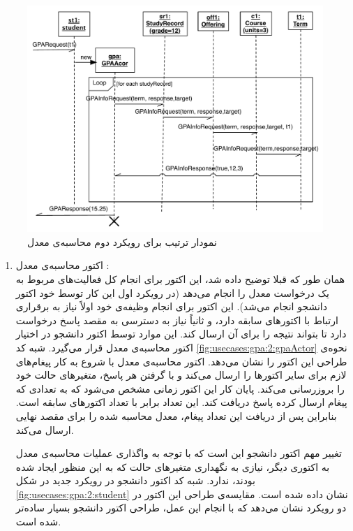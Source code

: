 \begin{figure}
    \begin{center}
	\includegraphics[width=16cm]{4-ProposedFramework/Figures/gpa_2_sequence.pdf}
    \end{center}
    \caption{\label{fig:gpa2_sequence} نمودار ترتیب برای رویکرد دوم محاسبه‌ی معدل }
\end{figure}
\FloatBarrier
\begin{enumerate}
\item اکتور محاسبه‌ی معدل :\\
همان طور که قبلا توضیح داده شد، این اکتور برای انجام کل فعالیت‌های مربوط به یک درخواست معدل را انجام می‌دهد (در رویکرد اول این‌ کار توسط خود اکتور دانشجو انجام می‌شد).  این اکتور برای انجام وظیفه‌ی خود اولاً نیاز به برقراری ارتباط با اکتورهای سابقه دارد، و ثانیاً نیاز به دسترسی به مقصد پاسخ درخواست دارد تا بتواند نتیجه را برای آن ارسال کند. این موارد توسط اکتور دانشجو در اختیار اکتور محاسبه‌ی معدل قرار می‌گیرد. شبه کد \ref{fig:usecases:gpa:2:gpaActor} نحوه‌ی طراحی این اکتور را نشان می‌دهد. اکتور محاسبه‌ی معدل با شروع به کار پیغام‌های لازم برای سایر اکتور‌ها را ارسال می‌کند و با گرفتن هر پاسخ، متغیر‌های حالت خود را بروزرسانی می‌کند. پایان کار این اکتور زمانی مشخص می‌شود که به تعدادی که پیغام ارسال کرده پاسخ دریافت کند. این تعداد برابر با تعداد اکتورهای سابقه است. بنابراین پس از دریافت این تعداد پیغام، معدل محاسبه شده را برای مقصد نهایی ارسال می‌کند.


تغییر مهم اکتور دانشجو این است که با توجه به واگذاری عملیات محاسبه‌ی معدل به اکتوری دیگر، نیازی به نگهداری متغیرهای حالت که به این منظور ایجاد شده بودند، ندارد. شبه کد 
اکتور دانشجو در رویکرد جدید در شکل \ref{fig:usecases:gpa:2:student}  نشان داده شده است. مقایسه‌ی طراحی این اکتور در دو رویکرد نشان می‌دهد که با انجام این عمل، طراحی اکتور دانشجو بسیار ساده‌تر شده است.

\FloatBarrier

\end{enumerate}
